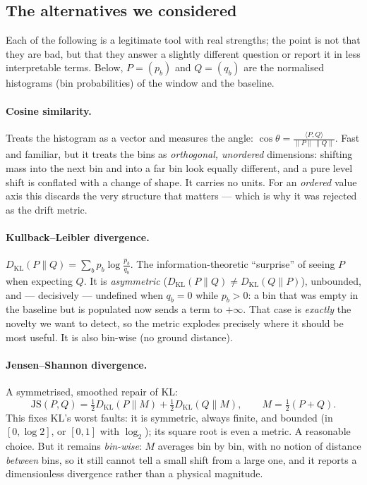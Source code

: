 \documentclass[11pt]{article}
\theoremstyle{definition}
\begin{document}
\subsection{The alternatives we considered}

Each of the following is a legitimate tool with real strengths; the point is not that they are bad,
but that they answer a slightly different question or report it in less interpretable terms. Below,
$P = (p_b)$ and $Q = (q_b)$ are the normalised histograms (bin probabilities) of the window and the
baseline.

\paragraph{Cosine similarity.} Treats the histogram as a vector and measures the angle:
$\cos\theta = \frac{\langle P, Q\rangle}{\|P\|\,\|Q\|}$. Fast and familiar, but it treats the bins as
\emph{orthogonal, unordered} dimensions: shifting mass into the next bin and into a far bin look
equally different, and a pure level shift is conflated with a change of shape. It carries no units.
For an \emph{ordered} value axis this discards the very structure that matters --- which is why it was
rejected as the drift metric.

\paragraph{Kullback--Leibler divergence.}
$D_{\mathrm{KL}}(P \| Q) = \sum_b p_b \log\frac{p_b}{q_b}$. The information-theoretic ``surprise'' of
seeing $P$ when expecting $Q$. It is \emph{asymmetric}
($D_{\mathrm{KL}}(P\|Q) \ne D_{\mathrm{KL}}(Q\|P)$), unbounded, and --- decisively --- undefined when
$q_b = 0$ while $p_b > 0$: a bin that was empty in the baseline but is populated now sends a term to
$+\infty$. That case is \emph{exactly} the novelty we want to detect, so the metric explodes
precisely where it should be most useful. It is also bin-wise (no ground distance).

\paragraph{Jensen--Shannon divergence.} A symmetrised, smoothed repair of KL:
\begin{equation}
  \mathrm{JS}(P, Q) = \tfrac{1}{2} D_{\mathrm{KL}}(P \| M) + \tfrac{1}{2} D_{\mathrm{KL}}(Q \| M),
  \qquad M = \tfrac{1}{2}(P + Q).
\end{equation}
This fixes KL's worst faults: it is symmetric, always finite, and bounded (in $[0, \log 2]$, or
$[0,1]$ with $\log_2$); its square root is even a metric. A reasonable choice. But it remains
\emph{bin-wise}: $M$ averages bin by bin, with no notion of distance \emph{between} bins, so it still
cannot tell a small shift from a large one, and it reports a dimensionless divergence rather than a
physical magnitude.
\end{document}
